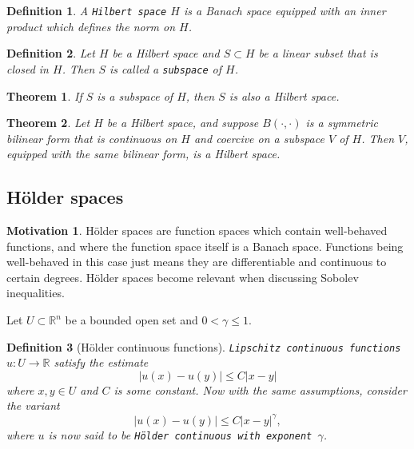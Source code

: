\documentclass[11pt]{article}
\newtheorem{theorem}{Theorem}
\newtheorem{definition}{Definition}
\theoremstyle{definition}
\newtheorem*{motivation}{Motivation}
\begin{document}
\begin{definition}
	A \texttt{Hilbert space} $H$ is a Banach space equipped with an inner product which defines the norm on $H$.
\end{definition}

\begin{definition}
	Let $H$ be a Hilbert space and $S \subset H$ be a linear subset that is closed in $H$. Then $S$ is called a \texttt{subspace} of $H$.
\end{definition}

\begin{theorem}
	If $S$ is a subspace of $H$, then $S$ is also a Hilbert space.
\end{theorem}

\begin{theorem}
	Let $H$ be a Hilbert space, and suppose $B(\cdot, \cdot)$ is a symmetric bilinear form
	that is continuous on $H$ and coercive on a subspace $V$ of $H$.
	Then $V$, equipped with the same bilinear form, is a Hilbert space.
\end{theorem}

\newpage

\subsection{H\"{o}lder spaces}
\begin{motivation}
	H\"{o}lder spaces are function spaces which contain well-behaved functions, and where the function space itself is a Banach space.
	Functions being well-behaved in this case just means they are differentiable and continuous to certain degrees.
	H\"{o}lder spaces become relevant when discussing Sobolev inequalities.
\end{motivation}
Let $U \subset \mathbb{R}^n$ be a bounded open set and $0 < \gamma \leq 1$.
\begin{definition}[H\"{o}lder continuous functions]
\texttt{Lipschitz continuous functions} $u : U \rightarrow \mathbb{R}$
satisfy the estimate
\[|u(x) - u(y)| \leq C|x-y|\]
where $x,y \in U$ and $C$ is some constant.
Now with the same assumptions, consider the variant
\[|u(x) - u(y)| \leq C|x-y|^{\gamma},\]
where $u$ is now said to be \texttt{H\"{o}lder continuous with exponent $\gamma$}.
\end{definition}
\end{document}

